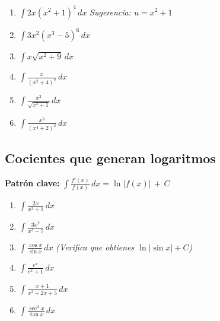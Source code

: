 \documentclass[12pt, letterpaper]{article}
\newcommand{\dx}{\,dx}
\newcommand{\CC}{\,+\,C}
\begin{document}
\begin{enumerate}[label=\textbf{\arabic*.}, leftmargin=*, itemsep=12pt, start=17]

  \item \facil\quad
    $\displaystyle\int 2x(x^2+1)^4\dx$
    \qquad\textit{Sugerencia: $u = x^2+1$}

  \item \facil\quad
    $\displaystyle\int 3x^2(x^3-5)^6\dx$

  \item \medio\quad
    $\displaystyle\int x\sqrt{x^2+9}\dx$

  \item \medio\quad
    $\displaystyle\int \frac{x}{(x^2+4)^3}\dx$

  \item \medio\quad
    $\displaystyle\int \frac{x^2}{\sqrt{x^3+1}}\dx$

  \item \dificil\quad
    $\displaystyle\int \frac{x^3}{(x^4+2)^2}\dx$

\end{enumerate}

\subsection{Cocientes que generan logaritmos}

\begin{cuadroadvertencia}
\small\textbf{Patrón clave:} $\displaystyle\int \frac{f'(x)}{f(x)}\dx = \ln|f(x)| \CC$
\end{cuadroadvertencia}

\begin{enumerate}[label=\textbf{\arabic*.}, leftmargin=*, itemsep=12pt, start=23]

  \item \facil\quad
    $\displaystyle\int \frac{2x}{x^2+1}\dx$

  \item \medio\quad
    $\displaystyle\int \frac{3x^2}{x^3-7}\dx$

  \item \medio\quad
    $\displaystyle\int \frac{\cos x}{\sin x}\dx$
    \qquad\textit{(Verifica que obtienes $\ln|\sin x|+C$)}

  \item \medio\quad
    $\displaystyle\int \frac{e^x}{e^x+1}\dx$

  \item \dificil\quad
    $\displaystyle\int \frac{x+1}{x^2+2x+5}\dx$

  \item \dificil\quad
    $\displaystyle\int \frac{\sec^2 x}{\tan x}\dx$

\end{enumerate}
\end{document}
